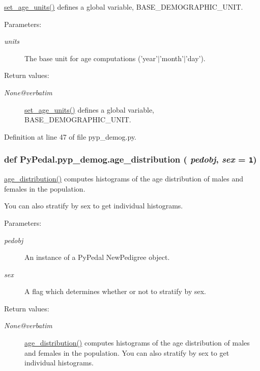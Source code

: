 \hyperlink{namespacePyPedal_1_1pyp__demog_6ccb10175c232e1f937d6b2c246de9a5}{set\_\-age\_\-units()} defines a global variable, BASE\_\-DEMOGRAPHIC\_\-UNIT. 

\begin{Desc}
\item[Parameters:]
\begin{description}
\item[{\em units}]The base unit for age computations ('year'$|$'month'$|$'day'). \end{description}
\end{Desc}
\begin{Desc}
\item[Return values:]
\begin{description}
\item[{\em None@verbatim}]\hyperlink{namespacePyPedal_1_1pyp__demog_6ccb10175c232e1f937d6b2c246de9a5}{set\_\-age\_\-units()} defines a global variable, BASE\_\-DEMOGRAPHIC\_\-UNIT.  \end{description}
\end{Desc}


Definition at line 47 of file pyp\_\-demog.py.\hypertarget{namespacePyPedal_1_1pyp__demog_7747d6a55a36517b83314e2637f5f9cd}{
\subsubsection[age\_\-distribution]{\setlength{\rightskip}{0pt plus 5cm}def Py\-Pedal.pyp\_\-demog.age\_\-distribution ( {\em pedobj},  {\em sex} = {\tt 1})}}
\label{namespacePyPedal_1_1pyp__demog_7747d6a55a36517b83314e2637f5f9cd}


\hyperlink{namespacePyPedal_1_1pyp__demog_7747d6a55a36517b83314e2637f5f9cd}{age\_\-distribution()} computes histograms of the age distribution of males and females in the population. 

You can also stratify by sex to get individual histograms. \begin{Desc}
\item[Parameters:]
\begin{description}
\item[{\em pedobj}]An instance of a Py\-Pedal New\-Pedigree object. \item[{\em sex}]A flag which determines whether or not to stratify by sex. \end{description}
\end{Desc}
\begin{Desc}
\item[Return values:]
\begin{description}
\item[{\em None@verbatim}]\hyperlink{namespacePyPedal_1_1pyp__demog_7747d6a55a36517b83314e2637f5f9cd}{age\_\-distribution()} computes histograms of the age distribution of males and females in the population. You can also stratify by sex to get individual histograms.  \end{description}
\end{Desc}


